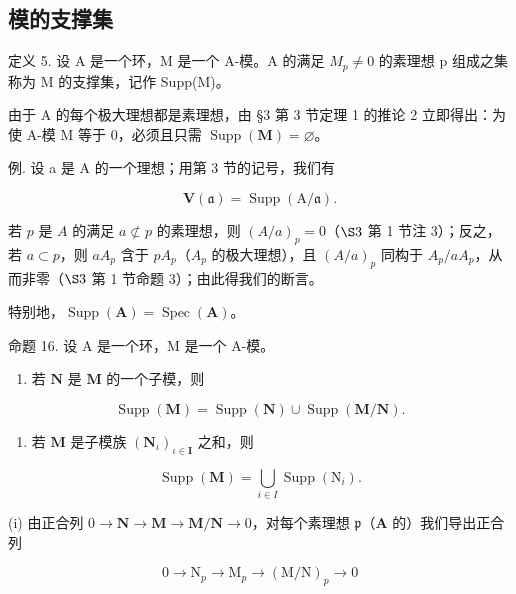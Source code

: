 \subsection{模的支撑集}

定义 5. 设 A 是一个环，M 是一个 A-模。A 的满足 \(M_{p} \neq 0\) 的素理想 p 组成之集称为 M 的支撑集，记作 Supp(M)。

由于 A 的每个极大理想都是素理想，由 §3 第 3 节定理 1 的推论 2 立即得出：为使 A-模 M 等于 0，必须且只需 \(\operatorname{Supp}(\mathbf{M}) = \varnothing\)。

例. 设 a 是 A 的一个理想；用第 3 节的记号，我们有

\[
\mathbf {V} (\mathfrak {a}) = \operatorname{Supp} (\mathrm{A} / \mathfrak {a}).\tag{9}
\]

若 \(p\) 是 \(A\) 的满足 \(a \not\subset p\) 的素理想，则 \((A/a)_p = 0\)（\(\S 3\) 第 1 节注 3）；反之，若 \(a \subset p\)，则 \(aA_p\) 含于 \(pA_p\)（\(A_p\) 的极大理想），且 \((A/a)_p\) 同构于 \(A_p/aA_p\)，从而非零（\(\S 3\) 第 1 节命题 3）；由此得我们的断言。

特别地，\(\operatorname{Supp}(\mathbf{A}) = \operatorname{Spec}(\mathbf{A})\)。

命题 16. 设 A 是一个环，M 是一个 A-模。

\begin{enumerate}
\def\labelenumi{(\roman{enumi})}
\tightlist
\item
  若 \(\mathbf{N}\) 是 \(\mathbf{M}\) 的一个子模，则
\end{enumerate}

\[
\operatorname{Supp} (\mathbf {M}) = \operatorname{Supp} (\mathbf {N}) \cup \operatorname{Supp} (\mathbf {M} / \mathbf {N}).
\]

\begin{enumerate}
\def\labelenumi{(\roman{enumi})}
\setcounter{enumi}{1}
\tightlist
\item
  若 \(\mathbf{M}\) 是子模族 \((\mathbf{N}_{\iota})_{\iota \in \mathbf{I}}\) 之和，则
\end{enumerate}

\[
\operatorname{Supp} (\mathbf {M}) = \bigcup_ {i \in I} \operatorname{Supp} \left(\mathrm{N} _ {i}\right).
\]

(i) 由正合列 \(0 \to \mathbf{N} \to \mathbf{M} \to \mathbf{M} / \mathbf{N} \to 0\)，对每个素理想 \(\mathfrak{p}\)（\(\mathbf{A}\) 的）我们导出正合列

\[
0 \rightarrow \mathrm{N} _ {p} \rightarrow \mathrm{M} _ {p} \rightarrow (\mathrm{M} / \mathrm{N}) _ {p} \rightarrow 0
\]


